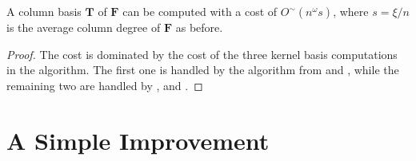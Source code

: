  
\begin{thm}
\label{thm:columnBasisCost1}A column basis $\mathbf{T}$ of $\mathbf{F}$
can be computed with a cost of $O^{\sim}\left(n^{\omega}s\right)$,
where $s=\xi/n$ is the average column degree of $\mathbf{F}$ as
before. \end{thm}
\begin{proof}
The cost is dominated by the cost of the three kernel basis computations
in the algorithm. The first one is handled by the algorithm from 
and , while the remaining two are handled
by , 
and .
\end{proof}
\begin{comment}
This can be done by computing a left $\left[0,\dots,0,d,\dots,d\right]$-minimal
kernel basis $\left[\mathbf{T}',V\right]$ of $\left[\mathbf{G}^{T},\mathbf{F}^{T}\right]^{T}$,
where $d$ is the degree of $\mathbf{F},$ $V$ is a unimodular matrix
and $\mathbf{T}'$ is a $m\times m$ matrix. Note that $\left[\mathbf{T}',V\right]$
has $m$ rows since the rank of $\left[\mathbf{G}^{T},\mathbf{F}^{T}\right]^{T}$
is $m$. Also note that since $\left[\mathbf{T},I\right]$ is a left
kernel basis with $\left[0,\dots,0,d,\dots,d\right]$-row degrees
bounded by $d$, the $\left[0,\dots,0,d,\dots,d\right]$-minimal kernel
basis $\left[\mathbf{T}',V\right]$ must also has its $\left[0,\dots,0,d,\dots,d\right]$-row
degrees bounded by $d$, hence the degree of $V$ must be 0. We can
then easily compute $\mathbf{T}=\mathbf{T}'V^{-1}$. 
\end{comment}



\section{\label{sec:successiveColBasisComputation}A Simple Improvement}


